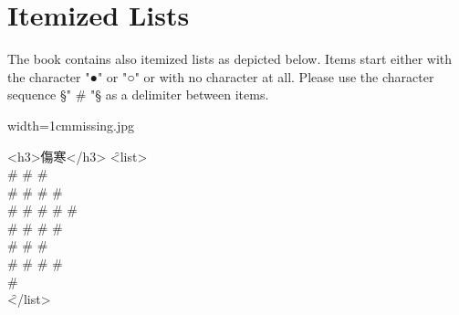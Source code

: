 \documentclass[fontsize=11pt, paper=a4, 
  DIV15,
  normalheadings,
  parskip=half-, 
  pointlessnumbers]{scrartcl}
\begin{document}
\section{Itemized Lists}
\begin{mainrule}
  The book contains also itemized lists as depicted below. Items start
  either with the character "●" or "○" or with no character at all.
  Please use the character sequence §" # "§ as a delimiter between items.
\end{mainrule}
\vspace{3mm}

\begin{sampleImageSmall}[\ 4: \, caption.]{width=1cm}{missing.jpg}
  \begin{typeChinese}
\someText
<h3>傷寒</h3>
\f{<list>}\\
\f{ # }\f{ # }\f{ # }\\
\f{ # }\f{ # }\f{ # }\f{ # }\\
\f{ # }\f{ # }\f{ # }\f{ # }\f{ # }\\
\f{ # }\f{ # }\f{ # }\f{ # }\\
\f{ # }\f{ # }\f{ # }\\
\f{ # }\f{ # }\f{ # }\f{ # }\\
\f{ # }\\
\f{</list>}
\someText
  \end{typeChinese}
\end{sampleImageSmall}
\end{document}
